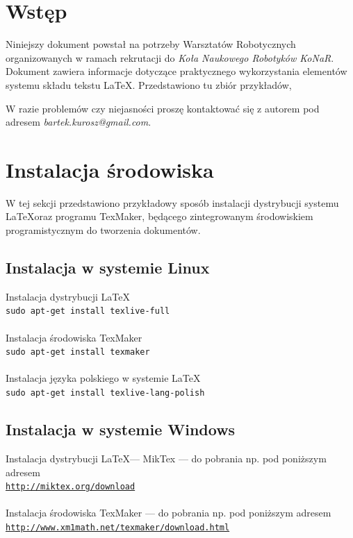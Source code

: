 \documentclass[12pt,a4paper]{article}
\begin{document}
\maketitle %
\tableofcontents %
\newpage %

\section{Wstęp}

Niniejszy dokument powstał na potrzeby Warsztatów Robotycznych organizowanych w ramach rekrutacji do \emph{Koła Naukowego Robotyków KoNaR}. Dokument zawiera informacje dotyczące praktycznego wykorzystania elementów systemu składu tekstu \LaTeX. Przedstawiono tu zbiór przykładów, 

W razie problemów czy niejasności proszę kontaktować się z autorem pod adresem \emph{bartek.kurosz@gmail.com}.


\section{Instalacja środowiska}
W tej sekcji przedstawiono przykładowy sposób instalacji dystrybucji systemu \LaTeX oraz programu TexMaker, będącego zintegrowanym środowiskiem programistycznym do tworzenia dokumentów.
\subsection{Instalacja w systemie Linux}
Instalacja dystrybucji \LaTeX\\
\texttt{sudo apt-get install texlive-full} \\\\
%
Instalacja środowiska TexMaker\\
\texttt{sudo apt-get install texmaker}\\\\
%
Instalacja języka polskiego w systemie \LaTeX\\
\texttt{sudo apt-get install texlive-lang-polish}

\subsection{Instalacja w systemie Windows}
Instalacja dystrybucji \LaTeX --- MikTex --- do pobrania np. pod poniższym adresem\\
\href{http://miktex.org/download}{\texttt{http://miktex.org/download}}\\\\
%
Instalacja środowiska TexMaker --- 
do pobrania np. pod poniższym adresem\\
\href{http://www.xm1math.net/texmaker/download.html}{\texttt{http://www.xm1math.net/texmaker/download.html}}
\end{document}
